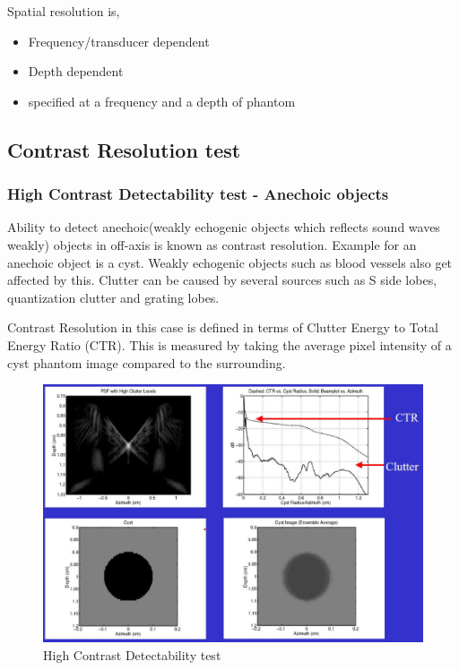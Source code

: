 \documentclass[12pt]{article}
\begin{document}
Spatial resolution is,
\begin{itemize}
    \item Frequency/transducer dependent
    \item Depth dependent
    \item specified at a frequency and a depth of phantom
\end{itemize}

\subsection{Contrast Resolution test}
\subsubsection{High Contrast Detectability test - Anechoic objects}

Ability to detect anechoic(weakly echogenic objects which reflects sound waves weakly) objects in off-axis is known as contrast resolution. Example for an anechoic object is a cyst. Weakly echogenic objects such as blood vessels also get affected by this. Clutter can be caused by several sources such as S side lobes, quantization clutter and grating lobes. 

Contrast Resolution in this case is defined in terms of Clutter Energy to Total Energy Ratio (CTR). This is measured by taking the average pixel intensity of a cyst phantom image compared to the surrounding.
\begin{figure}[!h]
    \centering
    \includegraphics[width=\linewidth]{clutter.jpg}
    \caption{\small{High Contrast Detectability test}}
    \label{fig:High Contrast Detectability test}
\end{figure}
\end{document}
